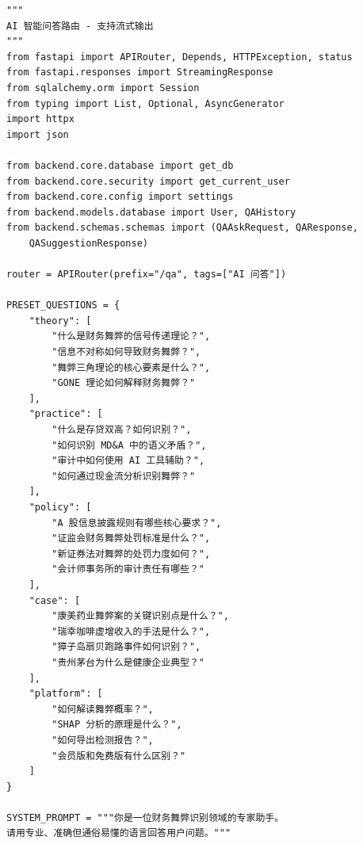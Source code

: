 \documentclass[a4paper,10pt]{article}
\begin{document}
\begin{lstlisting}
"""
AI 智能问答路由 - 支持流式输出
"""
from fastapi import APIRouter, Depends, HTTPException, status
from fastapi.responses import StreamingResponse
from sqlalchemy.orm import Session
from typing import List, Optional, AsyncGenerator
import httpx
import json

from backend.core.database import get_db
from backend.core.security import get_current_user
from backend.core.config import settings
from backend.models.database import User, QAHistory
from backend.schemas.schemas import (QAAskRequest, QAResponse,
    QASuggestionResponse)

router = APIRouter(prefix="/qa", tags=["AI 问答"])

PRESET_QUESTIONS = {
    "theory": [
        "什么是财务舞弊的信号传递理论？",
        "信息不对称如何导致财务舞弊？",
        "舞弊三角理论的核心要素是什么？",
        "GONE 理论如何解释财务舞弊？"
    ],
    "practice": [
        "什么是存贷双高？如何识别？",
        "如何识别 MD&A 中的语义矛盾？",
        "审计中如何使用 AI 工具辅助？",
        "如何通过现金流分析识别舞弊？"
    ],
    "policy": [
        "A 股信息披露规则有哪些核心要求？",
        "证监会财务舞弊处罚标准是什么？",
        "新证券法对舞弊的处罚力度如何？",
        "会计师事务所的审计责任有哪些？"
    ],
    "case": [
        "康美药业舞弊案的关键识别点是什么？",
        "瑞幸咖啡虚增收入的手法是什么？",
        "獐子岛扇贝跑路事件如何识别？",
        "贵州茅台为什么是健康企业典型？"
    ],
    "platform": [
        "如何解读舞弊概率？",
        "SHAP 分析的原理是什么？",
        "如何导出检测报告？",
        "会员版和免费版有什么区别？"
    ]
}

SYSTEM_PROMPT = """你是一位财务舞弊识别领域的专家助手。
请用专业、准确但通俗易懂的语言回答用户问题。"""


\end{lstlisting}
\end{document}
